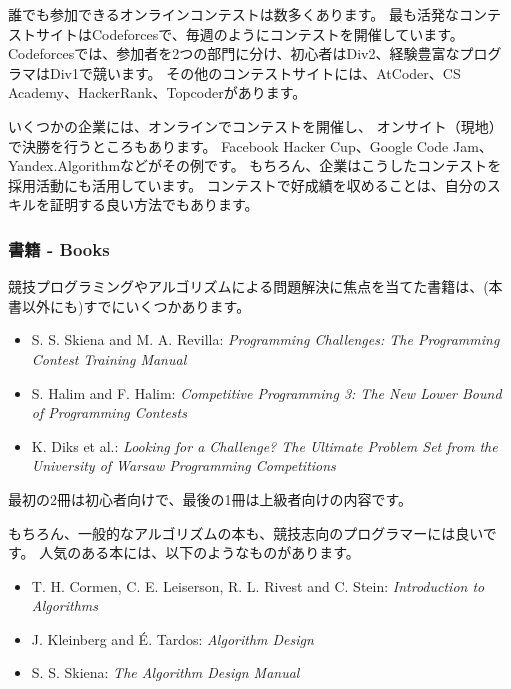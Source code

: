 誰でも参加できるオンラインコンテストは数多くあります。
最も活発なコンテストサイトはCodeforcesで、毎週のようにコンテストを開催しています。
Codeforcesでは、参加者を2つの部門に分け、初心者はDiv2、経験豊富なプログラマはDiv1で競います。
その他のコンテストサイトには、AtCoder、CS Academy、HackerRank、Topcoderがあります。

いくつかの企業には、オンラインでコンテストを開催し、
オンサイト（現地）で決勝を行うところもあります。
Facebook Hacker Cup、Google Code Jam、Yandex.Algorithmなどがその例です。
もちろん、企業はこうしたコンテストを採用活動にも活用しています。
コンテストで好成績を収めることは、自分のスキルを証明する良い方法でもあります。

\subsubsection{書籍 - Books}

競技プログラミングやアルゴリズムによる問題解決に焦点を当てた書籍は、(本書以外にも)すでにいくつかあります。

\begin{itemize}
\item S. S. Skiena and M. A. Revilla:
\emph{Programming Challenges: The Programming Contest Training Manual} \cite{ski03}
\item S. Halim and F. Halim:
\emph{Competitive Programming 3: The New Lower Bound of Programming Contests} \cite{hal13}
\item K. Diks et al.: \emph{Looking for a Challenge? The Ultimate Problem Set from
the University of Warsaw Programming Competitions} \cite{dik12}
\end{itemize}

最初の2冊は初心者向けで、最後の1冊は上級者向けの内容です。

もちろん、一般的なアルゴリズムの本も、競技志向のプログラマーには良いです。
人気のある本には、以下のようなものがあります。

\begin{itemize}
\item T. H. Cormen, C. E. Leiserson, R. L. Rivest and C. Stein:
\emph{Introduction to Algorithms} \cite{cor09}
\item J. Kleinberg and É. Tardos:
\emph{Algorithm Design} \cite{kle05}
\item S. S. Skiena:
\emph{The Algorithm Design Manual} \cite{ski08}
\end{itemize}
